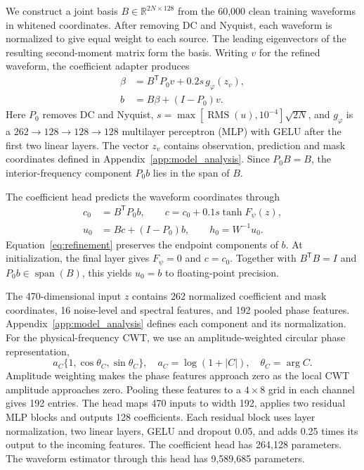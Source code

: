 \documentclass[10pt,prd,aps,a4paper,twocolumn,superscriptaddress,nofootinbib,floatfix]{revtex4-2}
\begin{document}
We construct a joint basis $B\in\mathbb R^{2N\times128}$ from the 60,000 clean training waveforms in whitened coordinates. After removing DC and Nyquist, each waveform is normalized to give equal weight to each source. The leading eigenvectors of the resulting second-moment matrix form the basis. Writing $v$ for the refined waveform, the coefficient adapter produces
\begin{align}
\beta&=B^{\mathsf T}P_0v+0.2s\,g_\varphi(z_v),\nonumber\\
b&=B\beta+(I-P_0)v.\label{eq:basis_adapter}
\end{align}
Here $P_0$ removes DC and Nyquist, $s=\max[\operatorname{RMS}(u),10^{-4}]\sqrt{2N}$, and $g_\varphi$ is a $262\to128\to128\to128$ multilayer perceptron (MLP) with GELU after the first two linear layers. The vector $z_v$ contains observation, prediction and mask coordinates defined in Appendix~\ref{app:model_analysis}. Since $P_0B=B$, the interior-frequency component $P_0b$ lies in the span of $B$.

The coefficient head predicts the waveform coordinates through
\begin{align}
c_0&=B^{\mathsf T}P_0b,\qquad
c=c_0+0.1s\tanh F_\psi(z),\label{eq:refinement}\\
u_0&=Bc+(I-P_0)b,\qquad h_0=W^{-1}u_0.\nonumber
\end{align}
Equation~\eqref{eq:refinement} preserves the endpoint components of $b$. At initialization, the final layer gives $F_\psi=0$ and $c=c_0$. Together with $B^{\mathsf T}B=I$ and $P_0b\in\operatorname{span}(B)$, this yields $u_0=b$ to floating-point precision.

The 470-dimensional input $z$ contains 262 normalized coefficient and mask coordinates, 16 noise-level and spectral features, and 192 pooled phase features. Appendix~\ref{app:model_analysis} defines each component and its normalization. For the physical-frequency CWT, we use an amplitude-weighted circular phase representation,
\begin{equation}
a_C\{1,\cos\theta_C,\sin\theta_C\},\quad
a_C=\log(1+|C|),\quad\theta_C=\arg C.\label{eq:continuous_phase}
\end{equation}
Amplitude weighting makes the phase features approach zero as the local CWT amplitude approaches zero. Pooling these features to a $4\times8$ grid in each channel gives 192 entries. The head maps 470 inputs to width 192, applies two residual MLP blocks and outputs 128 coefficients. Each residual block uses layer normalization, two linear layers, GELU and dropout 0.05, and adds 0.25 times its output to the incoming features. The coefficient head has 264,128 parameters. The waveform estimator through this head has 9,589,685 parameters.
\end{document}
